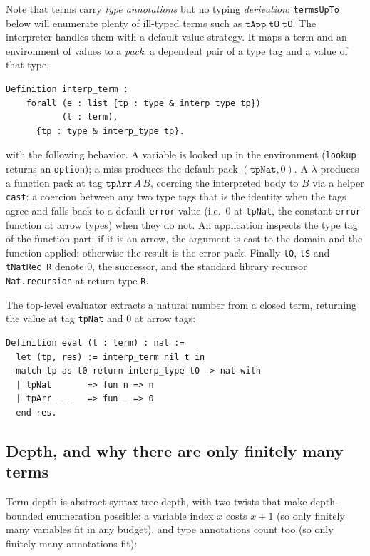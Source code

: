\documentclass[11pt,a4paper]{article}
\theoremstyle{plain}
\theoremstyle{definition}
\theoremstyle{remark}
\begin{document}
Note that terms carry \emph{type annotations} but no typing
\emph{derivation}: \texttt{termsUpTo} below will enumerate plenty of
ill-typed terms such as $\texttt{tApp}\;\texttt{tO}\;\texttt{tO}$.
The interpreter handles them with a default-value strategy.  It maps a
term and an environment of values to a \emph{pack}: a dependent pair
of a type tag and a value of that type,

\begin{lstlisting}
Definition interp_term :
    forall (e : list {tp : type & interp_type tp})
           (t : term),
      {tp : type & interp_type tp}.
\end{lstlisting}

with the following behavior.  A variable is looked up in the
environment (\texttt{lookup} returns an \texttt{option}); a miss
produces the default pack $(\texttt{tpNat}, 0)$.  A $\lambda$ produces
a function pack at tag $\texttt{tpArr}\,A\,B$, coercing the
interpreted body to $B$ via a helper \texttt{cast}: a coercion between
any two type tags that is the identity when the tags agree and falls
back to a default \texttt{error} value (i.e.\ $0$ at \texttt{tpNat},
the constant-\texttt{error} function at arrow types) when they do not.
An application inspects the type tag of the function part: if it is an
arrow, the argument is cast to the domain and the function applied;
otherwise the result is the error pack.  Finally \texttt{tO},
\texttt{tS} and \texttt{tNatRec R} denote $0$, the successor, and the
standard library recursor \texttt{Nat.recursion} at return type
\texttt{R}.

The top-level evaluator extracts a natural number from a closed term,
returning the value at tag \texttt{tpNat} and $0$ at arrow tags:

\begin{lstlisting}
Definition eval (t : term) : nat :=
  let (tp, res) := interp_term nil t in
  match tp as t0 return interp_type t0 -> nat with
  | tpNat       => fun n => n
  | tpArr _ _   => fun _ => 0
  end res.
\end{lstlisting}

\subsection{Depth, and why there are only finitely many terms}

Term depth is abstract-syntax-tree depth, with two twists that make
depth-bounded enumeration possible: a variable index $x$ costs
$x+1$ (so only finitely many variables fit in any budget), and type
annotations count too (so only finitely many annotations fit):
\end{document}
